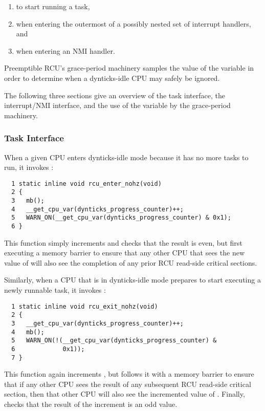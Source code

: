 \begin{enumerate}
\item	to start running a task,
\item	when entering the outermost of a possibly nested set of interrupt
	handlers, and
\item	when entering an NMI handler.
\end{enumerate}

Preemptible RCU's grace-period machinery samples the value of
the  variable in order to
determine when a dynticks-idle CPU may safely be ignored.

The following three sections give an overview of the task
interface, the interrupt/NMI interface, and the use of
the  variable by the
grace-period machinery.

\subsubsection{Task Interface}
\label{app:formal:Task Interface}

When a given CPU enters dynticks-idle mode because it has no more
tasks to run, it invokes :

{ \scriptsize
\begin{verbatim}
  1 static inline void rcu_enter_nohz(void)
  2 {
  3   mb();
  4   __get_cpu_var(dynticks_progress_counter)++;
  5   WARN_ON(__get_cpu_var(dynticks_progress_counter) & 0x1);
  6 }
\end{verbatim}
}

This function simply increments  and
checks that the result is even, but first executing a memory barrier
to ensure that any other CPU that sees the new value of
 will also see the completion
of any prior RCU read-side critical sections.

Similarly, when a CPU that is in dynticks-idle mode prepares to
start executing a newly runnable task, it invokes
:

{ \scriptsize
\begin{verbatim}
  1 static inline void rcu_exit_nohz(void)
  2 {
  3   __get_cpu_var(dynticks_progress_counter)++;
  4   mb();
  5   WARN_ON(!(__get_cpu_var(dynticks_progress_counter) &
  6             0x1));
  7 }
\end{verbatim}
}

This function again increments ,
but follows it with a memory barrier to ensure that if any other CPU
sees the result of any subsequent RCU read-side critical section,
then that other CPU will also see the incremented value of
.
Finally,  checks that the result of the
increment is an odd value.

